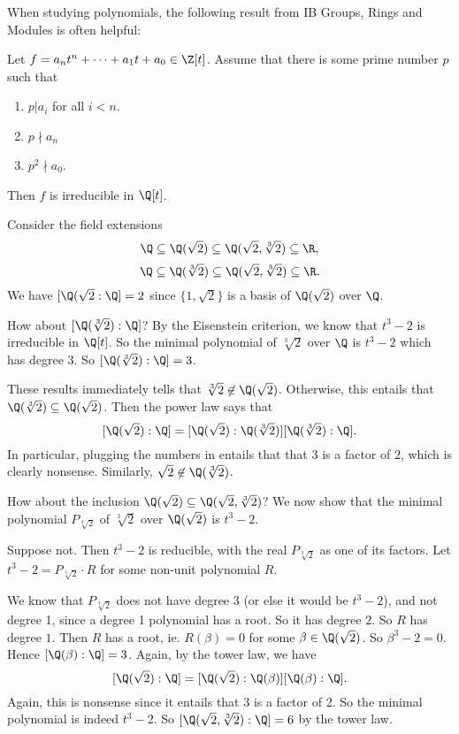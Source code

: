 \documentclass[a4paper]{article}
\begin{document}
When studying polynomials, the following result from IB Groups, Rings and Modules is often helpful:
\begin{prop}
  Let $f = a_nt^n + \cdots + a_1 t + a_0\in \Z[t]$. Assume that there is some prime number $p$ such that
  \begin{enumerate}
    \item $ p | a_i$ for all $i < n$.
    \item $p \nmid a_n$
    \item $p^2 \nmid a_0$.
  \end{enumerate}
  Then $f$ is irreducible in $\Q[t]$.
\end{prop}

\begin{eg}
  Consider the field extensions
  \[
    \Q \subseteq \Q(\sqrt{2})\subseteq \Q(\sqrt{2}, \sqrt[3]{2})\subseteq \R,
  \]
  \[
    \Q\subseteq \Q(\sqrt[3]{2}) \subseteq \Q(\sqrt{2}, \sqrt[3]{2})\subseteq \R.
  \]
  We have $[\Q(\sqrt{2}: \Q] = 2$ since $\{1, \sqrt{2}\}$ is a basis of $\Q(\sqrt{2})$ over $\Q$.

  How about $[\Q(\sqrt[3]{2}):\Q]$? By the Eisenstein criterion, we know that $t^3 - 2$ is irreducible in $\Q[t]$. So the minimal polynomial of $\sqrt[3]{2}$ over $\Q$ is $t^3 - 2$ which has degree 3. So $[\Q(\sqrt[3]{2}):\Q] = 3$.

  These results immediately tells that $\sqrt[3]{2}\not\in \Q(\sqrt{2})$. Otherwise, this entails that $\Q(\sqrt[3]{2}) \subseteq \Q(\sqrt{2})$. Then the power law says that
  \[
    [\Q(\sqrt{2}):\Q] = [\Q(\sqrt{2}):\Q(\sqrt[3]{2})][\Q(\sqrt[3]{2}):\Q].
  \]
  In particular, plugging the numbers in entails that that $3$ is a factor of $2$, which is clearly nonsense. Similarly, $\sqrt{2}\not \in \Q(\sqrt[3]{2})$.

  How about the inclusion $\Q(\sqrt{2})\subseteq \Q(\sqrt{2}, \sqrt[3]{2})$? We now show that the minimal polynomial $P_{\sqrt[3]{2}}$ of $\sqrt[3]{2}$ over $\Q(\sqrt{2})$ is $t^3 - 2$.

  Suppose not. Then $t^3 - 2$ is reducible, with the real $P_{\sqrt[3]{2}}$ as one of its factors. Let $t^3 - 2 = P_{\sqrt[3]{2}} \cdot R$ for some non-unit polynomial $R$.

  We know that $P_{\sqrt[3]{2}}$ does not have degree 3 (or else it would be $t^3 - 2$), and not degree 1, since a degree 1 polynomial has a root. So it has degree $2$. So $R$ has degree $1$. Then $R$ has a root, ie. $R(\beta) = 0$ for some $\beta \in \Q(\sqrt{2})$. So $\beta^3 - 2 = 0$. Hence $[\Q(\beta): \Q] = 3$. Again, by the tower law, we have
  \[
    [\Q(\sqrt{2}):\Q] = [\Q(\sqrt{2}):\Q(\beta)][\Q(\beta):\Q].
  \]
  Again, this is nonsense since it entails that 3 is a factor of 2. So the minimal polynomial is indeed $t^3 -2$. So $[\Q(\sqrt{2}, \sqrt[3]{2}):\Q] = 6$ by the tower law.


\end{eg}
\end{document}
